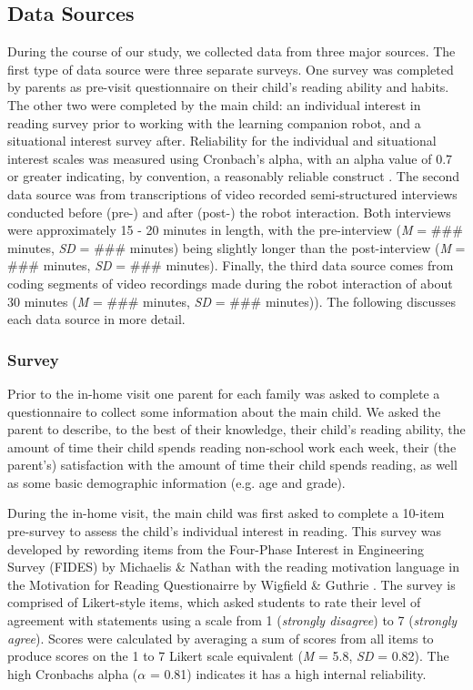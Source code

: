 \documentclass{sigchi}
\begin{document}
\subsection{Data Sources}
  During the course of our study, we collected data from three major sources. The first type of data source were three separate surveys. One survey was completed by parents as pre-visit questionnaire on their child's reading ability and habits. The other two were completed by the main child: an individual interest in reading survey prior to working with the learning companion robot, and a situational interest survey after. Reliability for the individual and situational interest scales was measured using Cronbach’s alpha, with an alpha value of 0.7 or greater indicating, by convention, a reasonably reliable construct \cite{Crocker:2009}. The second data source was from transcriptions of video recorded semi-structured interviews conducted before (pre-) and after (post-) the robot interaction. Both interviews were approximately 15 - 20 minutes in length, with the pre-interview (\textit{M} = \#\#\# minutes, \textit{SD} = \#\#\# minutes) being slightly longer than the post-interview (\textit{M} = \#\#\# minutes, \textit{SD} = \#\#\# minutes). Finally, the third data source comes from coding segments of video recordings made during the robot interaction of about 30 minutes (\textit{M} = \#\#\# minutes, \textit{SD} = \#\#\# minutes)). The following discusses each data source in more detail.
  
\subsubsection{Survey}

  Prior to the in-home visit one parent for each family was asked to complete a questionnaire to collect some information about the main child. We asked the parent to describe, to the best of their knowledge, their child's reading ability, the amount of time their child spends reading non-school work each week, their (the parent's) satisfaction with the amount of time their child spends reading, as well as some basic demographic information (e.g. age and grade).
 
  During the in-home visit, the main child was first asked to complete a 10-item pre-survey to assess the child's individual interest in reading. This survey was developed by rewording items from the Four-Phase Interest in Engineering Survey (FIDES) by Michaelis \& Nathan \cite{Michaelis:2015} with the reading motivation language in the Motivation for Reading Questionairre by Wigfield \& Guthrie \cite{Wigfield:1997}. The survey is comprised of Likert-style items, which asked students to rate their level of agreement with statements using a scale from 1 (\textit{strongly disagree}) to 7 (\textit{strongly agree}). Scores were calculated by averaging a sum of scores from all items to produce scores on the 1 to 7 Likert scale equivalent (\textit{M} = 5.8, \textit{SD} = 0.82). The high Cronbachs alpha ($\alpha$ = 0.81) indicates it has a high internal reliability.
 
\end{document}
